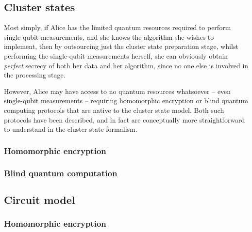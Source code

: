 \subsection{Cluster states} 

Most simply, if Alice has the limited quantum resources required to perform single-qubit measurements, and she knows the algorithm she wishes to implement, then by outsourcing just the cluster state preparation stage, whilst performing the single-qubit measurements herself, she can obviously obtain \textit{perfect} secrecy of both her data and her algorithm, since no one else is involved in the processing stage.

However, Alice may have access to no quantum resources whatsoever -- even single-qubit measurements -- requiring homomorphic encryption or blind quantum computing protocols that are native to the cluster state model. Both such protocols have been described, and in fact are conceptually more straightforward to understand in the cluster state formalism. 



%
%

\subsubsection{Homomorphic encryption} 


%
%

\subsubsection{Blind quantum computation} 


%
%

\subsection{Circuit model} 


%
%

\subsubsection{Homomorphic encryption} 

